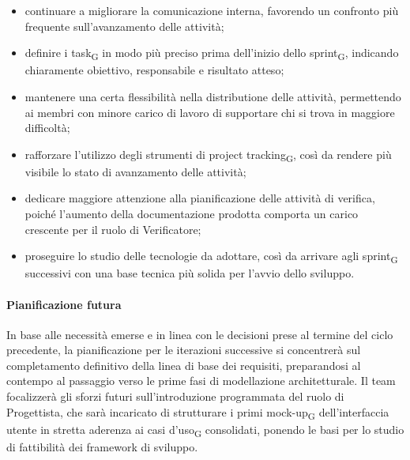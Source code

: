 \documentclass[a4paper, 10pt, colorlinks=true, linkcolor=black, urlcolor=blue, citecolor=blue, hidelinks]{article}
\begin{document}
\begin{itemize}
    \item continuare a migliorare la comunicazione interna, favorendo un confronto più frequente sull'avanzamento delle attività;

    \item definire i task\textsubscript{G} in modo più preciso prima dell'inizio dello sprint\textsubscript{G}, indicando chiaramente obiettivo, responsabile e risultato atteso;

    \item mantenere una certa flessibilità nella distributione delle attività, permettendo ai membri con minore carico di lavoro di supportare chi si trova in maggiore difficoltà;

    \item rafforzare l'utilizzo degli strumenti di project tracking\textsubscript{G}, così da rendere più visibile lo stato di avanzamento delle attività;

    \item dedicare maggiore attenzione alla pianificazione delle attività di verifica, poiché l'aumento della documentazione prodotta comporta un carico crescente per il ruolo di Verificatore;

    \item proseguire lo studio delle tecnologie da adottare, così da arrivare agli sprint\textsubscript{G} successivi con una base tecnica più solida per l'avvio dello sviluppo.
\end{itemize}

\paragraph{Pianificazione futura}
In base alle necessità emerse e in linea con le decisioni prese al termine del ciclo precedente, la pianificazione per le iterazioni successive si concentrerà sul completamento definitivo della linea di base dei requisiti, preparandosi al contempo al passaggio verso le prime fasi di modellazione architetturale. Il team focalizzerà gli sforzi futuri sull'introduzione programmata del ruolo di Progettista, che sarà incaricato di strutturare i primi mock-up\textsubscript{G} dell'interfaccia utente in stretta aderenza ai casi d'uso\textsubscript{G} consolidati, ponendo le basi per lo studio di fattibilità dei framework di sviluppo.
\end{document}

